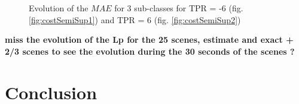 \documentclass[twocolumn,a4paper,10pt]{article}
\begin{document}
\begin{figure}
    \centering
    \caption{Evolution of the $MAE$ for 3 sub-classes for TPR = -6 (fig.  \ref{fig:costSemiSup1}) and TPR = 6 (fig. \ref{fig:costSemiSup2})}
    \label{fig:costSemiSup12}
\end{figure}

\textbf{miss the evolution of the Lp for the 25 scenes, estimate and exact + 2/3 scenes to see the evolution during the 30 seconds of the scenes ?}

\section{Conclusion}
\footnotesize


\end{document}
